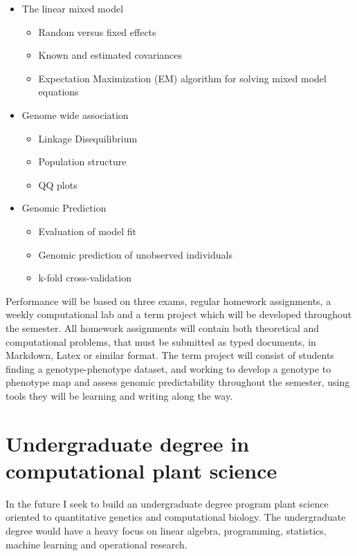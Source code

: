 \documentclass[10pt]{article}
\begin{document}
\begin{itemize}
	\item The linear mixed model
	\begin{itemize}
		\item Random versus fixed effects
		\item Known and estimated covariances
		\item Expectation Maximization (EM) algorithm for solving mixed model equations 
	\end{itemize} 

	\item Genome wide association
	\begin{itemize}
		\item Linkage Disequilibrium
		\item Population structure
		\item QQ plots
	\end{itemize} 

	\item Genomic Prediction
	\begin{itemize}
		\item Evaluation of model fit 
		\item Genomic prediction of unobserved individuals
		\item k-fold cross-validation 
	\end{itemize} 

\end{itemize}

Performance will be based on three exams, regular homework assignments, a weekly computational lab and a term project which will be developed throughout the semester. All homework assignments will contain both theoretical and computational problems, that must be submitted as typed documents, in Markdown, Latex or similar format. The term project will consist of students finding a genotype-phenotype dataset, and working to develop a genotype to phenotype map and assess genomic predictability throughout the semester, using tools they will be learning and writing along the way.


\section*{Undergraduate degree in computational plant science}

In the future I seek to build an undergraduate degree program plant science oriented to quantitative genetics and computational biology. The undergraduate degree would have a heavy focus on linear algebra, programming, statistics, machine learning and operational research. 
\end{document}
